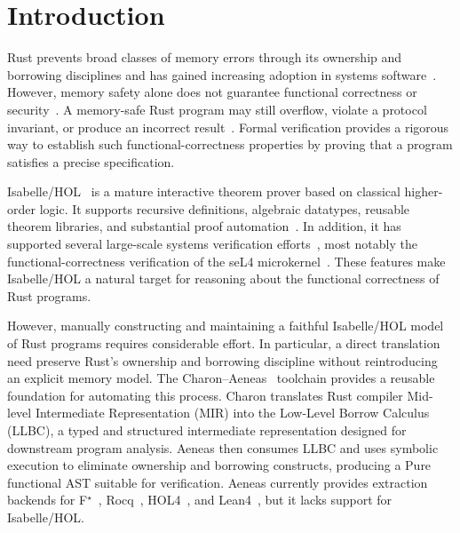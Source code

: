 \section{Introduction}
\label{sec:introduction}

Rust prevents broad classes of memory errors through its ownership and borrowing disciplines and has gained increasing adoption in systems software~\cite{jung2017rustbelt,li2024empirical}.
However, memory safety alone does not guarantee functional correctness or security~\cite{xu2021memory}. A memory-safe Rust program may still overflow, violate a protocol invariant, or produce an incorrect result~\cite{Edera}.
Formal verification provides a rigorous way to establish such functional-correctness properties by proving that a program satisfies a precise specification.




Isabelle/HOL~\cite{nipkow2002isabelle} is a mature interactive theorem prover based on classical higher-order logic.
It supports recursive definitions, algebraic datatypes, reusable theorem libraries, and substantial proof automation~\cite{bohme2010sledgehammer,nelson2019scaling}.
In addition, it has supported several large-scale systems verification efforts~\cite{alkassar2008formal,becker2026nitro,zhao2019rely}, most notably the functional-correctness verification of the seL4 microkernel~\cite{sel4-sosp}.
These features make Isabelle/HOL a natural target for reasoning about the functional correctness of Rust programs.


However, manually constructing and maintaining a faithful Isabelle/HOL model of Rust programs requires considerable effort. 
In particular, a direct translation need preserve Rust's ownership and borrowing discipline without reintroducing an explicit memory model.
The Charon--Aeneas~\cite{ho2025charon,ho2022aeneas} toolchain provides a reusable foundation for automating this process.
Charon translates Rust compiler Mid-level Intermediate Representation (MIR) into the Low-Level Borrow Calculus (LLBC), a typed and structured intermediate representation designed for downstream program analysis.
Aeneas then consumes LLBC and uses symbolic execution to eliminate ownership and borrowing constructs, producing a Pure functional AST suitable for verification.
Aeneas currently provides extraction backends for F$^\star$~\cite{swamy2016dependent}, Rocq~\cite{bertot2013interactive}, HOL4~\cite{slind2008brief}, and Lean4~\cite{moura2021lean}, but it lacks support for Isabelle/HOL.

